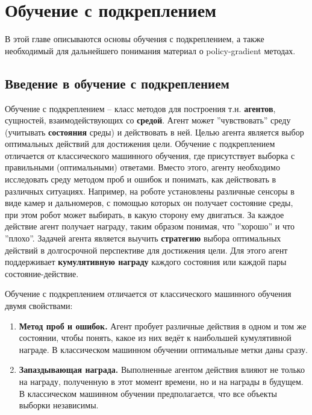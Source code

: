 \documentclass[12pt,a4paper]{amsart}
\begin{document}
\pagebreak
\section{Обучение с подкреплением}

В этой главе описываются основы обучения с подкреплением, а также необходимый для дальнейшего понимания материал о policy-gradient методах.

\subsection{Введение в обучение с подкреплением}

Обучение с подкреплением -- класс методов для построения т.н. \textbf{агентов}, сущностей, взаимодействующих со \textbf{средой}. Агент может ''чувствовать'' среду (учитывать \textbf{состояния} среды) и действовать в ней. Целью агента является выбор оптимальных действий для достижения цели. Обучение с подкреплением отличается от классического машинного обучения, где присутствует выборка с правильными (оптимальными) ответами. Вместо этого, агенту необходимо исследовать среду методом проб и ошибок и понимать, как действовать в различных ситуациях. Например, на роботе установлены различные сенсоры в виде камер и дальномеров, с помощью которых он получает состояние среды, при этом робот может выбирать, в какую сторону ему двигаться. За каждое действие агент получает награду, таким образом понимая, что ''хорошо'' и что ''плохо''. Задачей агента является выучить \textbf{стратегию} выбора оптимальных действий в долгосрочной перспективе для достижения цели. Для этого агент поддерживает \textbf{кумулятивную награду} каждого состояния или каждой пары состояние-действие.

Обучение с подкреплением отличается от классического машинного обучения двумя свойствами:

\begin{enumerate}
	\item \textbf{Метод проб и ошибок.} Агент пробует различные действия в одном и том же состоянии, чтобы понять, какое из них ведёт к наибольшей кумулятивной награде. В классическом машинном обучении оптимальные метки даны сразу.
	\item \textbf{Запаздывающая награда.} Выполненные агентом действия влияют не только на награду, полученную в этот момент времени, но и на награды в будущем. В классическом машинном обучении предполагается, что все объекты выборки независимы.
\end{enumerate}
\end{document}
